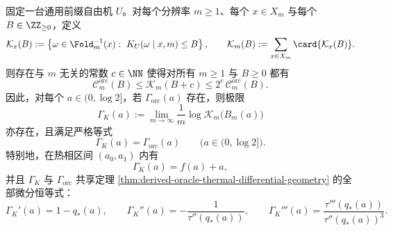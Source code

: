 \begin{theorem}\label{thm:derived-kolmogorov-oracle-exponent-isomorphism}
固定一台通用前缀自由机 \(U\)。对每个分辨率 \(m\ge 1\)、每个 \(x\in X_m\) 与每个 \(B\in\ZZ_{\ge 0}\)，定义
\[
\mathcal K_x(B):=\left\{\omega\in\Fold_m^{-1}(x):\ K_U(\omega\mid x,m)\le B\right\},
\qquad
\mathcal K_m(B):=\sum_{x\in X_m}\card{\mathcal K_x(B)}.
\]
则存在与 \(m\) 无关的常数 \(c\in\NN\) 使得对所有 \(m\ge 1\) 与 \(B\ge 0\) 都有
\[
\mathcal{C}^{\mathrm{orc}}_m(B)\le \mathcal K_m(B+c)\le 2^c\,\mathcal{C}^{\mathrm{orc}}_m(B).
\]
因此，对每个 \(a\in(0,\log 2]\)，若 \(\Gamma_{\mathrm{orc}}(a)\) 存在，则极限
\[
\Gamma_K(a):=\lim_{m\to\infty}\frac1m\log \mathcal K_m\bigl(B_m(a)\bigr)
\]
亦存在，且满足严格等式
\[
\Gamma_K(a)=\Gamma_{\mathrm{orc}}(a)
\qquad
\bigl(a\in(0,\log 2]\bigr).
\]
特别地，在热相区间 \((a_0,a_1)\) 内有
\[
\Gamma_K(a)=f(a)+a,
\]
并且 \(\Gamma_K\) 与 \(\Gamma_{\mathrm{orc}}\) 共享定理 \ref{thm:derived-oracle-thermal-differential-geometry} 的全部微分恒等式：
\[
\Gamma_K'(a)=1-q_*(a),
\qquad
\Gamma_K''(a)=-\frac{1}{\tau''(q_*(a))},
\qquad
\Gamma_K'''(a)=\frac{\tau'''(q_*(a))}{\tau''(q_*(a))^3}.
\]
\end{theorem}
